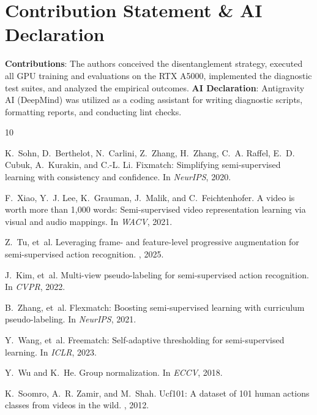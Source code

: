 \documentclass[10pt,twocolumn,letterpaper]{article}
\begin{document}
\section{Contribution Statement \& AI Declaration}
\textbf{Contributions}: The authors conceived the disentanglement strategy, executed all GPU training and evaluations on the RTX A5000, implemented the diagnostic test suites, and analyzed the empirical outcomes.
\textbf{AI Declaration}: Antigravity AI (DeepMind) was utilized as a coding assistant for writing diagnostic scripts, formatting reports, and conducting lint checks.

{\small

\begin{thebibliography}{10}\itemsep=-1pt

K.~Sohn, D.~Berthelot, N.~Carlini, Z.~Zhang, H.~Zhang, C.~A. Raffel, E.~D. Cubuk, A.~Kurakin, and C.-L. Li.
\newblock Fixmatch: Simplifying semi-supervised learning with consistency and confidence.
\newblock In {\em NeurIPS}, 2020.

F.~Xiao, Y.~J. Lee, K.~Grauman, J.~Malik, and C.~Feichtenhofer.
\newblock A video is worth more than 1,000 words: Semi-supervised video representation learning via visual and audio mappings.
\newblock In {\em WACV}, 2021.

Z.~Tu, et~al.
\newblock Leveraging frame- and feature-level progressive augmentation for semi-supervised action recognition.
, 2025.

J.~Kim, et~al.
\newblock Multi-view pseudo-labeling for semi-supervised action recognition.
\newblock In {\em CVPR}, 2022.

B.~Zhang, et~al.
\newblock Flexmatch: Boosting semi-supervised learning with curriculum pseudo-labeling.
\newblock In {\em NeurIPS}, 2021.

Y.~Wang, et~al.
\newblock Freematch: Self-adaptive thresholding for semi-supervised learning.
\newblock In {\em ICLR}, 2023.

Y.~Wu and K.~He.
\newblock Group normalization.
\newblock In {\em ECCV}, 2018.

K.~Soomro, A.~R. Zamir, and M.~Shah.
\newblock Ucf101: A dataset of 101 human actions classes from videos in the wild.
, 2012.

\end{thebibliography}
}
\end{document}
